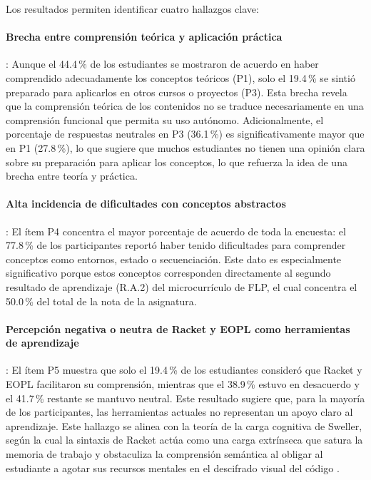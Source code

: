 \FloatBarrier

Los resultados permiten identificar cuatro hallazgos clave:

\paragraph{Brecha entre comprensión teórica y aplicación práctica}: Aunque el 44.4\,\% de los estudiantes se mostraron de acuerdo en haber comprendido adecuadamente los conceptos teóricos (P1), solo el 19.4\,\% se sintió preparado para aplicarlos en otros cursos o proyectos (P3). Esta brecha revela que la comprensión teórica de los contenidos no se traduce necesariamente en una comprensión funcional que permita su uso autónomo. Adicionalmente, el porcentaje de respuestas neutrales en P3 (36.1\,\%) es significativamente mayor que en P1 (27.8\,\%), lo que sugiere que muchos estudiantes no tienen una opinión clara sobre su preparación para aplicar los conceptos, lo que refuerza la idea de una brecha entre teoría y práctica.

\paragraph{Alta incidencia de dificultades con conceptos abstractos}: El ítem P4 concentra el mayor porcentaje de acuerdo de toda la encuesta: el {77.8\,\%} de los participantes reportó haber tenido dificultades para comprender conceptos como entornos, estado o secuenciación. Este dato es especialmente significativo porque estos conceptos corresponden directamente al segundo resultado de aprendizaje (R.A.2) del microcurrículo de FLP, el cual concentra el {50.0\,\%} del total de la nota de la asignatura.

\paragraph{Percepción negativa o neutra de Racket y EOPL como herramientas de aprendizaje}: El ítem P5 muestra que solo el {19.4\,\%} de los estudiantes consideró que Racket y EOPL facilitaron su comprensión, mientras que el {38.9\,\%} estuvo en desacuerdo y el {41.7\,\%} restante se mantuvo neutral. Este resultado sugiere que, para la mayoría de los participantes, las herramientas actuales no representan un apoyo claro al aprendizaje. Este hallazgo se alinea con la teoría de la carga cognitiva de Sweller, según la cual la sintaxis de Racket actúa como una carga extrínseca que satura la memoria de trabajo \cite{sweller2024cognitive} y obstaculiza la comprensión semántica al obligar al estudiante a agotar sus recursos mentales en el descifrado visual del código \cite{gordon2024linguistics}.

